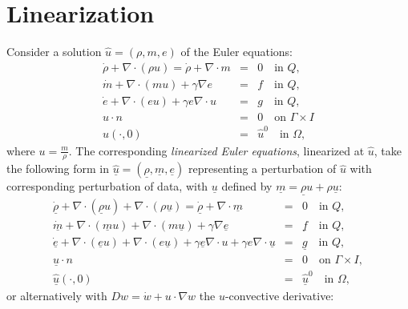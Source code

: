 \section{Linearization}
Consider a solution $\hat u=(\rho ,m,e)$ of the 
Euler equations:
\begin{equation}\label{euler10}
\begin{array}{rcl}
\dot \rho +\nabla\cdot (\rho u) =\dot \rho +\nabla\cdot m &=&  0 \quad \mbox{in } Q, \\
\dot m+\nabla\cdot (mu) + \gamma\nabla e&=&  f \quad \mbox{in } Q, \\
\dot e +\nabla\cdot (eu)+\gamma  e\nabla\cdot u &=& g  \quad \mbox{in } Q,\\ 
u\cdot n&=&0\quad \mbox{on } \Gamma\times I\\
\hat u(\cdot ,0)&=&\hat u^0\quad \mbox{in } \Omega , 
\end{array} 
\end{equation}
where $u=\frac{m}{\rho}$.
The corresponding \emph{linearized Euler equations}, linearized at $\hat u$,
take the following form in
$\underline{\hat u} =(\underline{\rho},\underline{m},\underline{e})$
representing a perturbation of $\hat u$ with corresponding 
perturbation of data, with $\underline{u}$ defined
by $\underline{m}=\underline{\rho}u+\rho\underline{u}$:
\begin{equation}\label{lineuler1}
\begin{array}{rcl}
\underline{\dot\rho} 
+\nabla\cdot (\underline{\rho}u)+\nabla\cdot (\rho\underline{u})=\underline{\dot\rho} +\nabla\cdot\underline{m}
&=& 0\quad \mbox{in } Q, \\
\underline{\dot m} +\nabla\cdot (\underline{m}u)+
\nabla\cdot (m\underline{u})
+ \gamma\nabla\underline{e}&=&  \underline{f} \quad \mbox{in } Q, \\
\underline{\dot e} +\nabla\cdot (\underline{e} u )
+\nabla\cdot (e\underline{u})+\gamma\underline{e}\nabla\cdot u
+\gamma e\nabla\cdot\underline{u} &=& \underline{g}  \quad \mbox{in } Q,\\ 
\underline{u}\cdot n&=&0\quad \mbox{on } \Gamma\times I,\\
\underline{\hat u}(\cdot ,0)&=&\underline{\hat u}^0\quad \mbox{in } \Omega , 
\end{array} 
\end{equation}
or alternatively with $Dw=\dot w+u\cdot\nabla w$ the $u$-convective
derivative:
